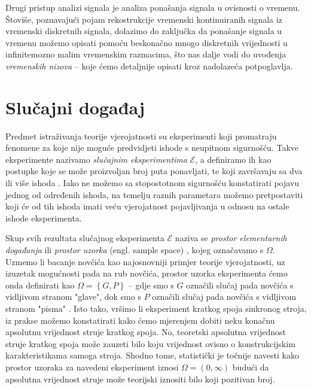 \documentclass[a4paper,12pt,oneside]{memoir}
\begin{document}
        
        Drugi pristup analizi signala je analiza ponašanja signala u ovisnosti o vremenu. Štoviše, poznavajući pojam rekostrukcije vremenski kontinuiranih signala iz vremenski diskretnih signala, dolazimo do zaključka da ponašanje signala u vremenu možemo opisati pomoću beskonačno mnogo diskretnih vrijednosti u infinitemozno malim vremenskim razmacima, što nas dalje vodi do uvođenja \textit{vremenskih nizova} -- koje ćemo detaljnije opisati kroz nadolazeća potpoglavlja.



        \section{Slučajni događaj}
            
            Predmet istraživanja teorije vjerojatnosti su eksperimenti koji promatraju fenomene za koje nije moguće predvidjeti ishode s neupitnom sigurnošću. Takve eksperimente nazivamo \textit{slučajnim eksperimentima} $\mathscr{E}$, a definiramo ih kao postupke koje se može proizvoljan broj puta ponavljati, te koji završavaju sa dva ili više ishoda \cite{Bahovec}. Iako ne možemo sa stopostotnom sigurnošću konstatirati pojavu jednog od određenih ishoda, na temelju raznih parametara možemo pretpostaviti koji će od tih ishoda imati veću vjerojatnost pojavljivanja u odnosu na ostale ishode eksperimenta.

            Skup svih rezultata slučajnog eksperimenta $\mathscr{E}$ naziva se \textit{prostor elementarnih događanja} ili \textit{prostor uzorka} (engl. sample space) \cite{Bahovec}, kojeg označavamo s $\Omega$. Uzmemo li bacanje novčića kao najosnovniji primjer teorije vjerojatnosti, uz izuzetak mogućnosti pada na rub novčića, prostor uzorka eksperimenta ćemo onda definirati kao $\Omega=\left\{G,P\right\}$ -- gdje smo s $G$ označili slučaj pada novčića s vidljivom stranom "glave", dok smo s $P$ označili slučaj pada novčića s vidljivom stranom "pisma" \cite{Dekking}. Isto tako, vršimo li eksperiment kratkog spoja sinkronog stroja, iz prakse možemo konstatirati kako ćemo mjerenjem dobiti neku konačnu apsolutnu vrijednost struje kratkog spoja. No, teoretski apsolutna vrijednost struje kratkog spoja može zauzeti bilo koju vrijednost ovisno o konstrukcijskim karakteristikama samoga stroja. Shodno tome, statistički je točnije navesti kako prostor uzoraka za navedeni eksperiment iznosi $\Omega=(0,\infty)$ budući da apsolutna vrijednost struje može teorijski iznositi bilo koji pozitivan broj.
\end{document}
